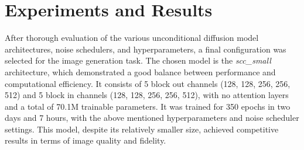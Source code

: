 \section{Experiments and Results}
\label{sec:experiments-and-results}
After thorough evaluation of the various unconditional diffusion model architectures, noise schedulers, and hyperparameters,
a final configuration was selected for the image generation task.
The chosen model is the \textit{scc\_small} architecture, which demonstrated a good balance between performance and computational efficiency.
It consists of 5 block out channels (128, 128, 256, 256, 512) and 5 block in channels (128, 128, 256, 256, 512), with no attention layers and a total of 70.1M trainable parameters.
It was trained for 350 epochs in two days and 7 hours, with the above mentioned hyperparameters and noise scheduler settings.
This model, despite its relatively smaller size, achieved competitive results in terms of image quality and fidelity.

